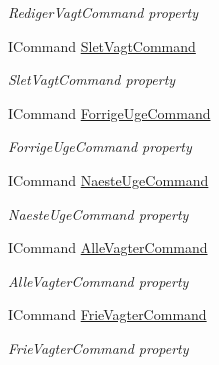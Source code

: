 \begin{DoxyCompactItemize}
\begin{DoxyCompactList}\small\item\em Rediger\+Vagt\+Command property \end{DoxyCompactList}\item 
I\+Command \hyperlink{class__1aarsproeve_1_1_view_model_1_1_vagtplan_view_model_a68e39a09c13e2544fdd3dd2c4dff1649}{Slet\+Vagt\+Command}
\begin{DoxyCompactList}\small\item\em Slet\+Vagt\+Command property \end{DoxyCompactList}\item 
I\+Command \hyperlink{class__1aarsproeve_1_1_view_model_1_1_vagtplan_view_model_a0b3b612ac629f20f80c28bc6560da7a1}{Forrige\+Uge\+Command}
\begin{DoxyCompactList}\small\item\em Forrige\+Uge\+Command property \end{DoxyCompactList}\item 
I\+Command \hyperlink{class__1aarsproeve_1_1_view_model_1_1_vagtplan_view_model_a4f463fb1507859004e80b064e43bfeaf}{Naeste\+Uge\+Command}
\begin{DoxyCompactList}\small\item\em Naeste\+Uge\+Command property \end{DoxyCompactList}\item 
I\+Command \hyperlink{class__1aarsproeve_1_1_view_model_1_1_vagtplan_view_model_a9ff1365b62555d179cf34a5e11a6d5fc}{Alle\+Vagter\+Command}
\begin{DoxyCompactList}\small\item\em Alle\+Vagter\+Command property \end{DoxyCompactList}\item 
I\+Command \hyperlink{class__1aarsproeve_1_1_view_model_1_1_vagtplan_view_model_ac17a43f67342176e4a94bea072876d9c}{Frie\+Vagter\+Command}
\begin{DoxyCompactList}\small\item\em Frie\+Vagter\+Command property \end{DoxyCompactList}\item 

\end{DoxyCompactItemize}
